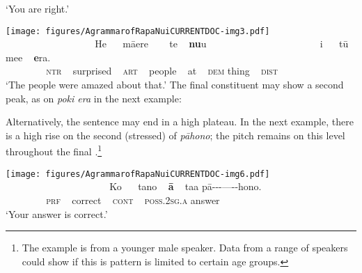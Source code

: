 \glt 
‘You are right.’ \textstyleExampleref{[R630-05.036]}
\z

\newpage 
\ea\label{ex:2.7}
\texttt{[image: figures/AgrammarofRapaNuiCURRENTDOC-img3.pdf]}\\
\gll ~ ~ ~ ~ ~~~~~~~~~~~ He ~~ māere ~~~ te ~ \textbf{nu}{\ꞌ}u ~~~~~~~~~~~~~~~~~~~~~~ {\ꞌ}i ~~ tū me{\ꞌ}e ~ \textbf{e}ra.\\
 ~ ~ ~ ~ ~ \textsc{ntr} ~ surprised ~ \textsc{art} ~ people ~ at ~ \textsc{dem} thing ~ \textsc{dist}\\

\glt
‘The people were amazed about that.’ \textstyleExampleref{[R630-07.038]}
\z
The final constituent may show a second peak, as on \textit{poki era} in the next example:


Alternatively, the sentence may end in a high plateau. In the next example, there is a high rise on the second (stressed)  of \textit{pāhono}; the pitch remains on this level throughout the final .\footnote{\label{fn:60}The example is from a younger male speaker. Data from a range of speakers could show if this is pattern is limited to certain age groups.} 

 
\ea\label{ex:2.9}
\texttt{[image: figures/AgrammarofRapaNuiCURRENTDOC-img6.pdf]}\\
\gll ~ ~ ~ ~ ~~~~~~~~~~~~~~ Ko ~~ tano ~ \textbf{{\ꞌ}ā} ~ ta{\ꞌ}a  pā\nobreakdash-\nobreakdash-\nobreakdash-\nobreakdash---\nobreakdash-\nobreakdash-hono.\\
 ~ ~ ~ ~ ~ \textsc{prf} ~ correct ~ \textsc{cont} ~ \textsc{poss.2sg.a}  answer\\

\glt 
‘Your answer is correct.’ \textstyleExampleref{[R630-07.015]}
\z

